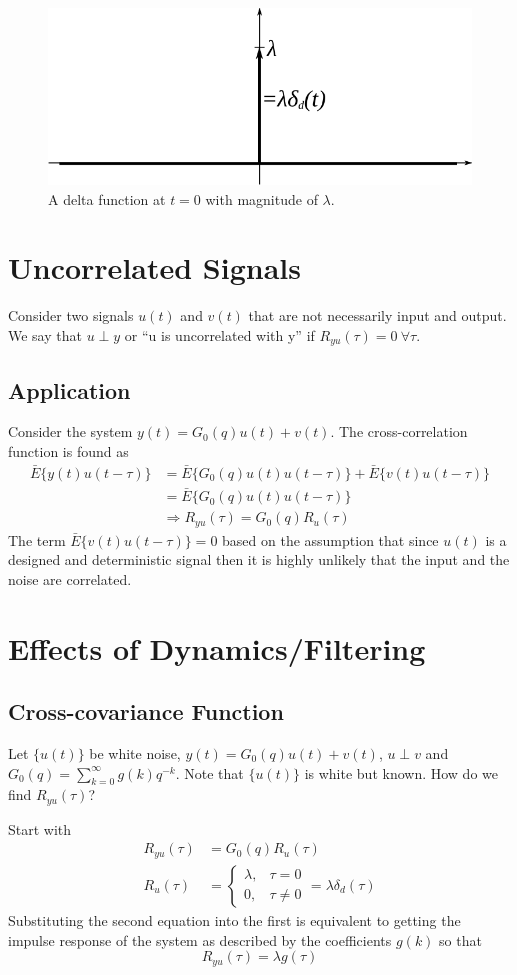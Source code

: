 \begin{figure}[ht!]
	\centering
	\includegraphics[width=.4\textwidth]{images/04deltaFn}
	\caption{A delta function at $t=0$ with magnitude of $\lambda$.}
	\label{fig:04deltaFn}
\end{figure}

\section{Uncorrelated Signals}
Consider two signals $u(t)$ and $v(t)$ that are not necessarily input and output. We say that $u\perp y$ or ``u is uncorrelated with y'' if $R_{yu}(\tau)=0 ~\forall \tau$.

\subsection{Application}
Consider the system $y(t)=G_0(q)u(t)+v(t)$. The cross-correlation function is found as
\begin{align*}
\bar{E}\{y(t)u(t-\tau)\} &= \bar{E}\{G_0(q)u(t)u(t-\tau)\} + \bar{E}\{v(t)u(t-\tau)\} \\
&= \bar{E}\{G_0(q)u(t)u(t-\tau)\} \\
&\Rightarrow R_{yu}(\tau) = G_0(q)R_u(\tau)
\end{align*}
The term $\bar{E}\{v(t)u(t-\tau)\} = 0$ based on the assumption that since $u(t)$ is a designed and deterministic signal then it is highly unlikely that the input and the noise are correlated.

\section{Effects of Dynamics/Filtering}
\subsection{Cross-covariance Function}
Let $\{u(t)\}$ be white noise, $y(t)=G_0(q)u(t)+v(t)$, $u\perp v$ and $G_0(q)=\sum_{k=0}^\infty g(k)q^{-k}$. Note that $\{u(t)\}$ is white but known. How do we find $R_{yu}(\tau)$?

Start with
\begin{align*}
R_{yu}(\tau) &= G_0(q)R_u(\tau) \\
R_u(\tau) &= \begin{cases} \lambda, & \tau=0 \\ 0, & \tau\neq 0 \end{cases} = \lambda\delta_d(\tau)
\end{align*}
Substituting the second equation into the first is equivalent to getting the impulse response of the system as described by the coefficients $g(k)$ so that
$$R_{yu}(\tau) = \lambda g(\tau)$$

